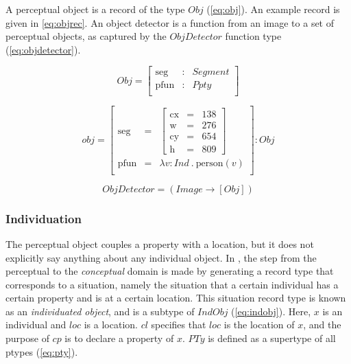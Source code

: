 A perceptual object is a record of the type $Obj$ (\autoref{eq:obj}).
An example record is given in \autoref{eq:objrec}.
An object detector is a function from an image to a set of perceptual objects, as captured by the $ObjDetector$ function type (\autoref{eq:objdetector}).

\begin{equation}\label{eq:obj}
Obj = \left[\begin{array}{rcl}
\text{seg} &:& Segment\\
\text{pfun} &:& Ppty \\
\end{array}\right]\end{equation}

\begin{equation}\label{eq:objrec}
obj =
\left[\begin{array}{rcl}
\text{seg} &=& \left[\begin{array}{rcl}
\text{cx} &=& 138\\
\text{w} &=& 276\\
\text{cy} &=& 654\\
\text{h} &=& 809
\end{array}\right]\\
\text{pfun} &=& \lambda v:Ind\ .\ \text{person}(v)\\
\end{array}\right] : Obj\end{equation}

\begin{equation}\label{eq:objdetector}
ObjDetector = ( Image \rightarrow [Obj] )
\end{equation}



\subsubsection{Individuation}

The perceptual object couples a property with a location, but it does not explicitly say anything about any individual object.
In \cite{lspc}, the step from the perceptual to the \textit{conceptual} domain is made by generating a record type that corresponds to a situation, namely the situation that a certain individual has a certain property and is at a certain location.
This situation record type is known as an \textit{individuated object}, and is a subtype of $IndObj$ (\autoref{eq:indobj}).
Here, $x$ is an individual and $loc$ is a location.
$cl$ specifies that $loc$ is the location of $x$, and the purpose of $cp$ is to declare a property of $x$.
$PTy$ is defined as a supertype of all ptypes (\autoref{eq:pty}).

